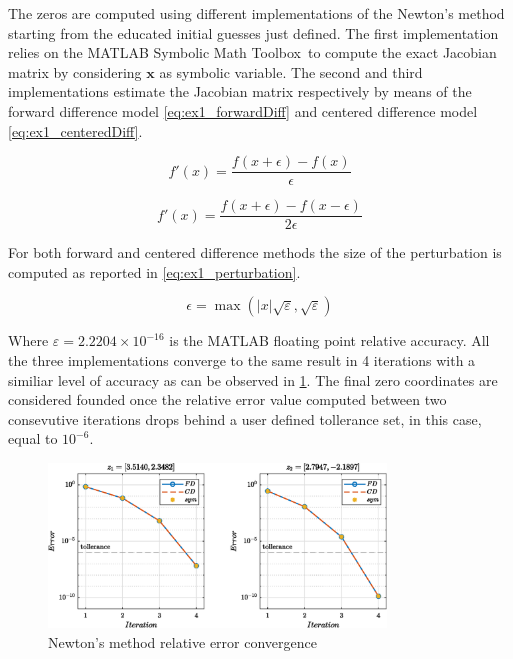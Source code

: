 \documentclass[11pt,a4paper,oneside]{article}
\renewcommand{\vec}[1]{\mathbf{#1}}
\begin{document}
The zeros are computed using different implementations of the Newton's method starting from the educated initial guesses just defined.
The first implementation relies on the MATLAB Symbolic Math Toolbox\texttrademark\, to compute the exact Jacobian matrix by considering $\vec{x}$ as symbolic variable.
The second and third implementations estimate the Jacobian matrix respectively by means of the forward difference model \cref{eq:ex1_forwardDiff} and centered difference model \cref{eq:ex1_centeredDiff}.

\begin{equation}
    f'(x) = \frac{f(x + \epsilon) - f(x)}{\epsilon}
    \label{eq:ex1_forwardDiff}
\end{equation}

\begin{equation}
    f'(x) = \frac{f(x + \epsilon) - f(x - \epsilon)}{2 \epsilon}
    \label{eq:ex1_centeredDiff}
\end{equation}

For both forward and centered difference methods the size of the perturbation is computed as reported in \cref{eq:ex1_perturbation}.

\begin{equation}
    \epsilon = \max (\left\lvert x \right\rvert\sqrt{\varepsilon}, \sqrt{\varepsilon})
    \label{eq:ex1_perturbation}
\end{equation}

Where $\varepsilon=2.2204\times10^{-16}$ is the MATLAB floating point relative accuracy.
\clearpage
All the three implementations converge to the same result in 4 iterations with a similiar level of accuracy as can be observed in \cref{fig:ex1_convergence}.
The final zero coordinates are considered founded once the relative error value computed between two consevutive iterations drops behind a user defined tollerance set, in this case, equal to $10^{-6}$.

\begin{figure}[htb]
    \centering
    \includegraphics*[width=0.8\textwidth, keepaspectratio]{ex1_convergence.eps}
    \caption[]{\label{fig:ex1_convergence} Newton's method relative error convergence}
\end{figure}
\end{document}

